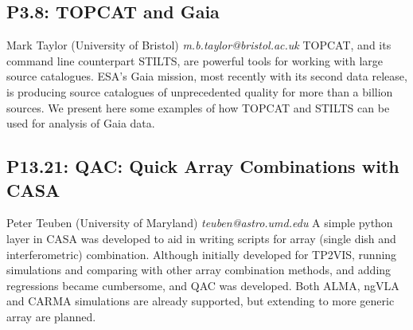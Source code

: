 \documentclass{report}
\begin{document}
\subsection*{P3.8: TOPCAT and Gaia}
\bigskip
Mark Taylor (University of Bristol) \newline   \newline   \newline   \newline  \newline  \newline\newline
{\it m.b.taylor@bristol.ac.uk}\newline
\newline\newline
TOPCAT, and its command line counterpart STILTS, are powerful tools for working with large source catalogues.  ESA's Gaia mission, most recently with its second data release, is producing source catalogues of unprecedented quality for more than a billion sources.  We present here some examples of how TOPCAT and STILTS can be used for analysis of Gaia data.\newline
\newpage
\subsection*{P13.21: QAC: Quick Array Combinations with CASA}
\bigskip
Peter Teuben (University of Maryland) \newline   \newline   \newline   \newline  \newline  \newline\newline
{\it teuben@astro.umd.edu}\newline
\newline\newline
A simple python layer in CASA was developed to aid in writing scripts for array (single dish and interferometric) combination. Although initially developed for TP2VIS, running simulations and comparing with other array combination methods, and adding regressions became cumbersome, and QAC was developed. Both ALMA, ngVLA and CARMA simulations are already supported, but extending to more generic array are planned.\newline
\newpage
\end{document}
